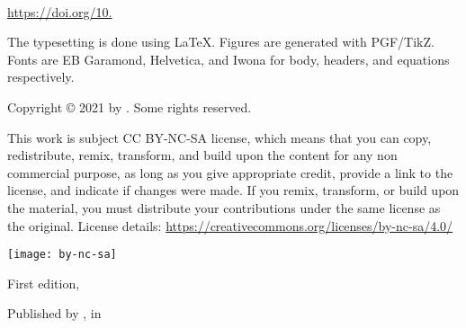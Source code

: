 
{\small\setlength{\parindent}{0em}\setlength{\parskip}{1em}
~

\vfill

\url{https://doi.org/10.}

The typesetting is done using \LaTeX. Figures are generated with PGF/TikZ. Fonts are EB Garamond, Helvetica, and Iwona for body, headers, and equations respectively.

Copyright \copyright{} 2021 by \authorname. Some rights reserved.

This work is subject CC BY-NC-SA license, which means that you can copy, redistribute, remix, transform, and build upon the content for any non commercial purpose, as long as you give appropriate credit, provide a link to the license, and indicate if changes were made. If you remix, transform, or build upon the material, you must distribute your contributions under the same license as the original. License details: \url{https://creativecommons.org/licenses/by-nc-sa/4.0/}

\texttt{[image: by-nc-sa]}

First edition, \editionyear{}


Published by \publisher{}, in \place{}
}\cleardoublepage
